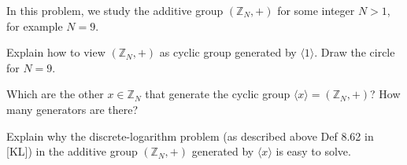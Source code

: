 \documentclass[a4paper,10pt,landscape,twocolumn]{scrartcl}
\begin{document}
\begin{exercise}
In this problem, we study the additive group $(\mathbb{Z}_N, +)$ for
some integer $N>1$, for example $N=9$.

\begin{subex}
  Explain how to view $(\mathbb{Z}_N, +)$ as cyclic group generated by
  $\langle 1\rangle$. Draw the circle for $N=9$.
\end{subex}

\begin{subex}
Which are the other $x \in \mathbb{Z}_N$ that generate the cyclic
group $\langle x \rangle = (\mathbb{Z}_N, +)$? How many generators are there?
\end{subex}

\begin{subex}
Explain why the discrete-logarithm problem (as described above Def 8.62
in [KL]) in the additive group
$(\mathbb{Z}_N, +)$ generated by $\langle x \rangle$ is easy to solve.
\end{subex}


\end{exercise}


%


\end{document}
